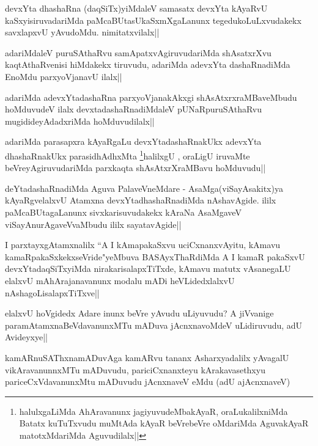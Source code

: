 
\begin{artha}
devxYta dhashaRna (daqSiTx)yiMdaleV samasatx devxYta kAyaRvU kaSxyisiruvadariMda paMcaBUtasUkaSxmXgaLanunx tegedukoLuLxvudakekx savxlapxvU yAvudoMdu. nimitatxvilalx||
\end{artha}

\begin{artha}
adariMdaleV puruSAthaRvu samApatxvAgiruvudariMda shAsatxrXvu kaqtAthaRvenisi hiMdakekx tiruvudu, adariMda adevxYta dashaRnadiMda EnoMdu parxyoVjanavU ilalx||
\end{artha}

\begin{artha}
adariMda adevxYtadashaRna parxyoVjanakAkxgi shAsAtxrxraMBaveMbudu hoMduvudeV ilalx devxtadashaRnadiMdaleV pUNaRpuruSAthaRvu mugidideyAdadxriMda hoMduvudilalx||
\end{artha}

\begin{artha}
adariMda parasapxra kAyaRgaLu devxYtadashaRnakUkx adevxYta dhashaRnakUkx parasidhAdhxMta 
\footnote[1]{halulxgaLiMda AhAravanunx jagiyuvudeMbakAyaR, oraLukalilxniMda Batatx kuTuTxvudu muMtAda kAyaR beVrebeVre oMdariMda AguvakAyaR matotxMdariMda Aguvudilalx||}halilxgU , oraLigU iruvaMte beVreyAgiruvudariMda parxkaqta shAsAtxrXraMBavu hoMduvudu||
\end{artha}

\begin{artha}
deYtadashaRnadiMda Aguva PalaveVneMdare - AsaMga(viSayAsakitx)ya kAyaRgvelalxvU Atamxna  devxYtadhashaRnadiMda nAshavAgide. ililx paMcaBUtagaLanunx sivxkarisuvudakekx kAraNa AsaMgaveV viSayAnurAgaveVvaMbudu ililx sayatavAgide||
\end{artha}

\begin{artha}
I parxtayxgAtamxnalilx ``A I kAmapakaSxvu uciCxnanxvAyitu, kAmavu kamaRpakaSxkekxseVride"yeMbuva BASAyxThaRdiMda A I kamaR pakaSxvU devxYtadaqSiTxyiMda nirakarisalapxTiTxde, kAmavu matutx vAsanegaLU elalxvU mAhArajanavanunx modalu mADi heVLidedxlalxvU nAshagoLisalapxTiTxve||
\end{artha}

\begin{artha}
elalxvU hoVgidedx Adare inunx beVre yAvudu uLiyuvudu? A jiVvanige paramAtamxnaBeVdavanunxMTu  mADuva jAcnxnavoMdeV uLidiruvudu, adU Avideyxye||
\end{artha}

\begin{artha}
kamARnuSAThxnamADuvAga kamARvu tananx Asharxyadalilx yAvagalU vikAravanunnxMTu mADuvudu, pariciCxnanxteyu kArakavasethxyu pariceCxVdavanunxMtu mADuvudu jAcnxnaveV eMdu (adU ajAcnxnaveV)
\end{artha}

